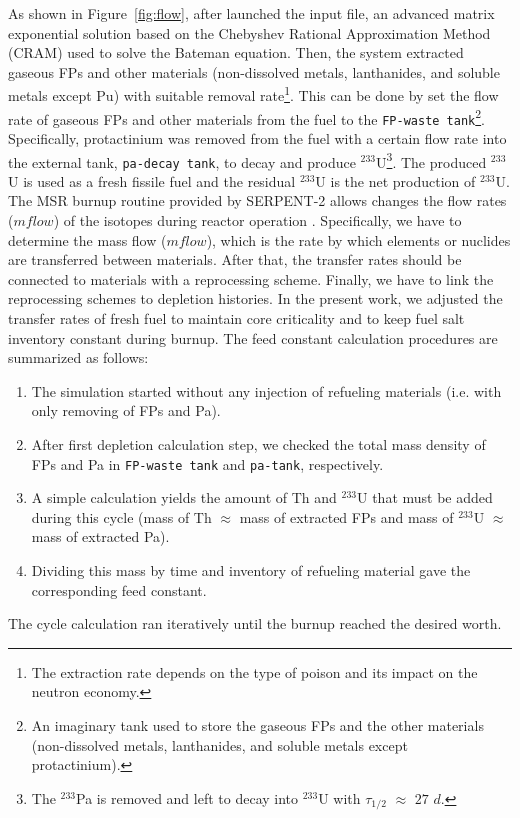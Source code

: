 As shown in Figure~\ref{fig:flow}, after launched the input file, an advanced 
matrix exponential solution based on the Chebyshev Rational Approximation 
Method (CRAM) \cite{isotalo2016improving} used to solve the Bateman equation. 
Then, the system extracted gaseous \gls{FPs} and other materials 
(non-dissolved metals, lanthanides, and soluble metals except Pu) with 
suitable removal rate\footnote{The extraction rate depends on the type of 
poison and its impact on the neutron
economy.}. This can be done by set the 
flow rate of gaseous \gls{FPs} and other materials from the fuel to the 
\texttt{FP-waste tank}\footnote{An imaginary tank used to store the gaseous 
\gls{FPs} and the other materials (non-dissolved metals, lanthanides, and 
soluble metals except protactinium).}. Specifically, protactinium was removed 
from the fuel with a certain flow rate into the external tank, 
\texttt{pa-decay tank}, to decay and produce $^{233}$U\footnote{The 
$^{233}$Pa is removed and left to decay into $^{233}$U with $\tau_{1/2}$ 
$\approx$ $27$ $d$.}. The produced $^{233}$U is used as a fresh fissile fuel 
and the residual $^{233}$U is the net production of $^{233}$U. The MSR burnup 
routine provided by SERPENT-2 allows changes the flow rates ($mflow$) of the 
isotopes during reactor operation \cite{aufiero2013extended}. Specifically, we have to determine the mass flow ($mflow$), which is the rate by 
which elements or nuclides are transferred between materials. After that, the 
transfer rates should be connected to materials with a reprocessing scheme. 
Finally, we have to link the reprocessing schemes to depletion histories. In 
the present work, we adjusted the transfer rates of fresh fuel to maintain core 
criticality and to keep fuel salt inventory constant during burnup. The feed constant calculation procedures are summarized as follows:
\begin{enumerate}
	\item The simulation started without any injection of refueling materials (i.e. with only removing of FPs and Pa).
	\item After first depletion calculation step, we checked the total mass density of FPs and Pa in \texttt{FP-waste tank} and \texttt{pa-tank}, respectively.
	\item A simple calculation yields the amount of Th and $^{233}$U that must be added during this cycle (mass of Th $\approx$ mass of extracted FPs and mass of $^{233}$U $\approx$ mass of extracted Pa).
	\item Dividing this mass by time and inventory of refueling material gave the corresponding feed constant.
\end{enumerate}
The cycle calculation ran iteratively until the burnup reached the desired worth.

